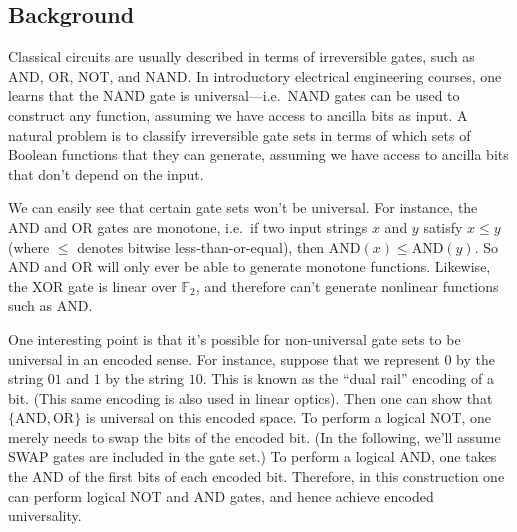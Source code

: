 \documentclass[11pt]{report}
\theoremstyle{plain}
\theoremstyle{definition}
\begin{document}
\subsection{Background}

Classical circuits are usually described in terms of irreversible gates, such as AND, OR, NOT, and NAND. In introductory electrical engineering courses, one learns that the NAND gate is universal---i.e.\ NAND gates can be used to construct any function, assuming we have access to ancilla bits as input. A natural problem is to classify irreversible gate sets in terms of which sets of Boolean functions that they can generate, assuming we have access to ancilla bits that don't depend on the input.

We can easily see that certain gate sets won't be universal. For instance, the AND and OR gates are monotone, i.e.\ if two input strings $x$ and $y$ satisfy $x\leq y$ (where $\leq$ denotes bitwise less-than-or-equal), then $\mathrm{AND}(x)\leq \mathrm{AND}(y)$.  So AND and OR will only ever be able to generate monotone functions. Likewise, the XOR gate is linear over $\mathbb{F}_2$, and therefore can't generate nonlinear functions such as AND.

One interesting point is that it's possible for non-universal gate sets to be universal in an encoded sense. For instance, suppose that we represent $0$ by the string $01$ and $1$ by the string $10$. This is known as the ``dual rail'' encoding of a bit. (This same encoding is also used in linear optics). Then one can show that $\{\mathrm{AND},\mathrm{OR}\}$ is universal on this encoded space. To perform a logical NOT, one merely needs to swap the bits of the encoded bit. (In the following, we'll assume SWAP gates are included in the gate set.) To perform a logical AND, one takes the AND of the first bits of each encoded bit.  Therefore, in this construction one can perform logical NOT and AND gates, and hence achieve encoded universality.
\end{document}
